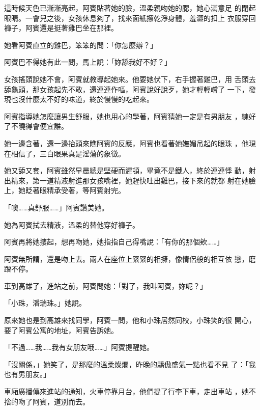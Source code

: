這時候天色已漸漸亮起，阿賓貼著她的臉，溫柔親吻她的腮，她心滿意足
的閉起眼睛。一會兒之後，女孩休息夠了，找來面紙擦乾淨身體，羞澀的扣上
衣服穿回褲子，阿賓還是挺著雞巴坐在那裡。

她看阿賓直立的雞巴，笨笨的問：「你怎麼辦？」

阿賓巴不得她有此一問，馬上說：「妳舔我好不好？」

女孩搖頭說她不會，阿賓就教導起她來。他要她伏下，右手握著雞巴，用
舌頭去舔龜頭，那女孩起先不敢，還連連作嘔，阿賓說好說歹，她才輕輕嚐了
一下，發現也沒什麼太不好的味道，終於慢慢的吃起來。

阿賓指導她怎麼讓男生舒服，她也用心的學著，阿賓猜她一定是有男朋友
，練好了不曉得會便宜誰。

她一邊含著，還一邊抬頭來瞧阿賓的反應，阿賓也看著她嫵媚吊起的眼珠
，他現在相信了，三白眼果真是淫蕩的象徵。

她又舔又套，阿賓雖然早晨總是堅硬而遲頓，畢竟不是鐵人，終於連連悸
動，射出精來，第一道精液射進那女孩嘴裡，她趕快吐出雞巴，接下來的就都
射在她臉上，她眨著眼精承受著，等阿賓射完。

「噢……真舒服……」阿賓讚美她。

她為阿賓拭去精液，溫柔的替他穿好褲子。

阿賓再將她摟起，想再吻她，她指指自己得嘴說：「有你的那個欸……」

阿賓無所謂，還是吻上去。兩人在座位上緊緊的相擁，像情侶般的相互依
戀，磨蹭不停。

車到高雄了，進站之前，阿賓問她：「對了，我叫阿賓，妳呢？」

「小珠，潘瑞珠。」她說。

原來她也是到高雄來找同學，阿賓一問，他和小珠居然同校，小珠笑的很
開心，要了阿賓公寓的地址，阿賓告訴她。

「不過……我……我有女朋友哦……」阿賓提醒她。

「沒關係，」她笑了，是那麼的溫柔燦爛，昨晚的驕傲盛氣一點也看不見
了：「我也有男朋友。」

車廂廣播傳來進站的通知，火車停靠月台，他們提了行李下車，走出車站
，她不捨的吻了阿賓，道別而去。










